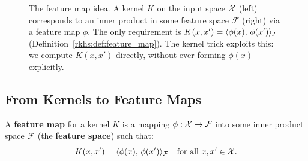 \begin{notechapter}
\begin{figure}[ht]
\caption{The feature map idea. A kernel $K$ on the
input space $\mathcal{X}$ (left) corresponds to an inner product
in some feature space $\mathcal{F}$ (right) via a
feature map $\phi$. The only requirement is
$K(x,x') = \langle \phi(x),\, \phi(x') \rangle_{\mathcal{F}}$
(Definition~\ref{rkhs:def:feature_map}). The kernel trick
exploits this: we compute $K(x,x')$ directly, without
ever forming $\phi(x)$ explicitly.}
\label{rkhs:fig:feature_map_concept}
\end{figure}

\subsection{From Kernels to Feature Maps}

\begin{definitionbox}
\begin{definition}
\label{rkhs:def:feature_map}
A \textbf{feature map} for a kernel $K$ is a mapping $\phi: \mathcal{X} \to
\mathcal{F}$ into some inner product space $\mathcal{F}$ (the
\textbf{feature space}) such that:
\begin{equation}
\label{rkhs:eq:feature_map}
K(x, x') = \langle \phi(x),\, \phi(x') \rangle_{\mathcal{F}} \quad \text{for all } x, x' \in \mathcal{X}.
\end{equation}
\end{definition}
\end{definitionbox}


\end{notechapter}
